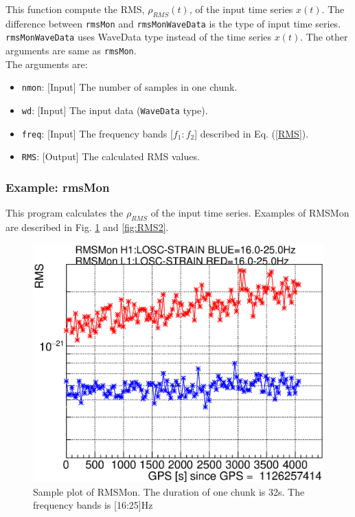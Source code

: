 This function compute the RMS, $\rho_{RMS}(t)$, of the input time series $x(t)$.
The difference between {\tt rmsMon} and {\tt rmsMonWaveData} is the type of input time series.
{\tt rmsMonWaveData} uses WaveData type instead of the time series $x(t)$.
The other arguments are same as {\tt rmsMon}.\\
The arguments are:
\begin{itemize}
\item {\tt nmon}: [Input] The number of samples in one chunk.
\item {\tt wd}: [Input] The input data ({\tt WaveData} type).
\item {\tt freq}: [Input] The frequency bands [$f_1:f_2$] described in Eq. (\ref{RMS}). 
\item {\tt {RMS}}: [Output] The calculated RMS values. 
\end{itemize}


\subsubsection{{\bf Example:} rmsMon }
This program calculates the $\rho_{RMS}$ of the input time series.
Examples of RMSMon are described in Fig. \ref{fig:RMS1} and \ref{fig:RMS2}.


\begin{figure}[ht]
  \begin{center}
    \includegraphics[width=0.9\hsize]{./fig/RMSMon/sample_16-25.eps}
    \caption{Sample plot of RMSMon. The duration of one chunk is 32s. The frequency bands is [16:25]Hz}
     \label{fig:RMS1}
  \end{center}
\end{figure}

